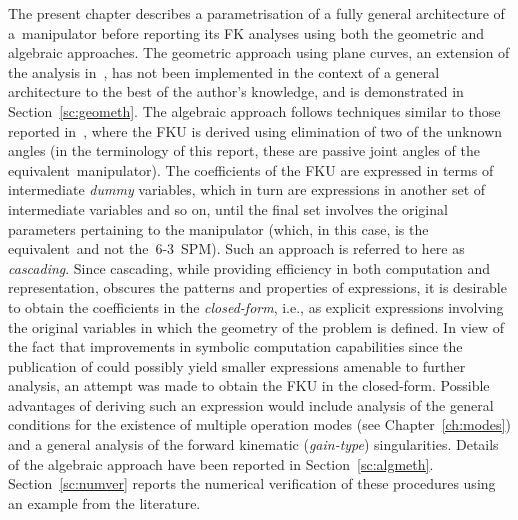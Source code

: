 \documentclass[DD]{iitmdiss}
\newcommand{\mref}[1]{\ref{#1}}
\newcommand{\mcite}[1]{\cite{#1}}
\begin{document}
The present chapter describes a parametrisation of a fully general architecture of a~\rps manipulator before reporting its FK analyses using both the geometric and algebraic approaches. The geometric approach using plane curves, an extension of the analysis in~\mcite{tk2017a}, has not been implemented in the context of a general architecture to the best of the author's knowledge, and is demonstrated in Section~\mref{sc:geometh}. The algebraic approach follows techniques similar to those reported in~\mcite{innocenti1990}, where the FKU is derived using elimination of two of the unknown angles (in the terminology of this report, these are passive joint angles of the equivalent~\rps manipulator). The coefficients of the FKU are expressed in terms of intermediate \emph{dummy} variables, which in turn are expressions in another set of intermediate variables and so on, until the final set involves the original parameters pertaining to the manipulator (which, in this case, is the equivalent~\rps and not the~6-3~SPM). Such an approach is referred to here as \emph{cascading}. Since cascading, while providing efficiency in both computation and representation, obscures the patterns and properties of expressions, it is desirable to obtain the coefficients in the \emph{closed-form}, i.e., as explicit expressions involving the original variables in which the geometry of the problem is defined. In view of the fact that improvements in symbolic computation capabilities since the publication of\mcite{innocenti1990} could possibly yield smaller expressions amenable to further analysis, an attempt was made to obtain the FKU in the closed-form. Possible advantages of deriving such an expression would include analysis of the general conditions for the existence of multiple operation modes (see Chapter~\mref{ch:modes}) and a general analysis of the forward kinematic (\emph{gain-type}) singularities. Details of the algebraic approach have been reported in Section~\mref{sc:algmeth}. Section~\mref{sc:numver} reports the numerical verification of these procedures using an example from the literature.
%
\end{document}
